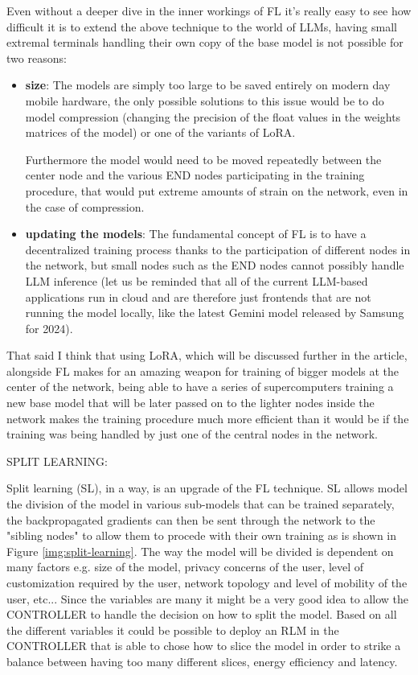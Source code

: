 Even without a deeper dive in the inner workings of FL it's really easy to see how difficult it is
to extend the above technique to the world of LLMs, having small extremal terminals handling their
own copy of the base model is not possible for two reasons:
\begin{itemize}
	\item \textbf{size}: The models are simply too large to be saved entirely on modern day
		mobile hardware, the only possible solutions to this issue would be to do model
		compression (changing the precision of the float values in the weights matrices of
		the model) or one of the variants of LoRA.

		Furthermore the model would need to be moved repeatedly between the center node and
		the various END nodes participating in the training procedure, that would put
		extreme amounts of strain on the network, even in the case of compression.
	\item \textbf{updating the models}: The fundamental concept of FL is to have a
		decentralized training process thanks to the participation of different nodes in 
		the network, but small nodes such as the END nodes cannot possibly handle LLM
		inference (let us be reminded that all of the current LLM-based applications run in
		cloud and are therefore just frontends that are not running the model locally, like
		the latest Gemini model released by Samsung for 2024). 
\end{itemize}
That said I think that using LoRA, which will be discussed further in the article, alongside FL
makes for an amazing weapon for training of bigger models at the center of the network, being able
to have a series of supercomputers training a new base model that will be later passed on to the
lighter nodes inside the network makes the training procedure much more efficient than it would be
if the training was being handled by just one of the central nodes in the network.

\bigskip
\noindent
SPLIT LEARNING:

Split learning (SL), in a way, is an upgrade of the FL technique.
SL allows model the division of the model in various sub-models that can be trained separately, the
backpropagated gradients can then be sent through the network to the "sibling nodes" to allow them
to procede with their own training as is shown in Figure \ref{img:split-learning}.
The way the model will be divided is dependent on many factors e.g. size of the
model, privacy concerns of the user, level of customization required by the user, network topology
and level of mobility of the user, etc...
Since the variables are many it might be a very good idea to allow the CONTROLLER to handle the
decision on how to split the model. Based on all the different variables it could be possible to
deploy an RLM in the CONTROLLER that is able to chose how to slice the model in order to strike a
balance between having too many different slices, energy efficiency and latency.


